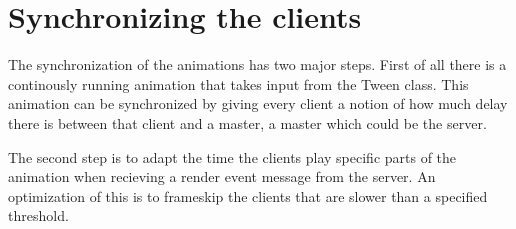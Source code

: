 \chapter{Synchronizing the clients}

The synchronization of the animations has two major steps. First of all there is a continously running animation that takes input from the Tween class. This animation can be synchronized by giving every client a notion of how much delay there is between that client and a master, a master which could be the server.

The second step is to adapt the time the clients play specific parts of the animation when recieving a render event message from the server. An optimization of this is to frameskip the clients that are slower than a specified threshold.



